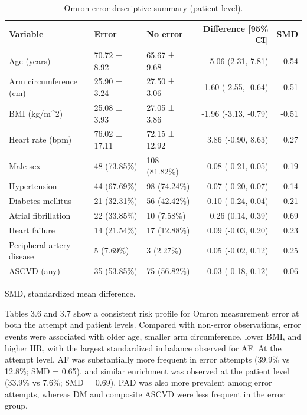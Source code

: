 \documentclass[
  12pt,
  letterpaper,
  openany,
  oneside]{book}
\begin{document}
\begin{table}
\caption{Omron error descriptive summary (patient-level).}\tabularnewline

\fontsize{10.0pt}{13.0pt}\selectfont
\begin{tabular*}{1\linewidth}{@{\extracolsep{\fill}}lllrr}
\toprule
{\bfseries Variable} & {\bfseries Error} & {\bfseries No error} & {\bfseries Difference
[95\% CI]} & {\bfseries SMD} \\ 
\midrule\addlinespace[2.5pt]
Age (years) & 70.72 ± 8.92 & 65.67 ± 9.68 & 5.06 (2.31, 7.81) & 0.54 \\ 
Arm circumference (cm) & 25.90 ± 3.24 & 27.50 ± 3.06 & -1.60 (-2.55, -0.64) & -0.51 \\ 
BMI (kg/m\textasciicircum{}2) & 25.08 ± 3.93 & 27.05 ± 3.86 & -1.96 (-3.13, -0.79) & -0.51 \\ 
Heart rate (bpm) & 76.02 ± 17.11 & 72.15 ± 12.92 & 3.86 (-0.90, 8.63) & 0.27 \\ 
Male sex & 48 (73.85\%) & 108 (81.82\%) & -0.08 (-0.21, 0.05) & -0.19 \\ 
Hypertension & 44 (67.69\%) & 98 (74.24\%) & -0.07 (-0.20, 0.07) & -0.14 \\ 
Diabetes mellitus & 21 (32.31\%) & 56 (42.42\%) & -0.10 (-0.24, 0.04) & -0.21 \\ 
Atrial fibrillation & 22 (33.85\%) & 10 (7.58\%) & 0.26 (0.14, 0.39) & 0.69 \\ 
Heart failure & 14 (21.54\%) & 17 (12.88\%) & 0.09 (-0.03, 0.20) & 0.23 \\ 
Peripheral artery disease & 5 (7.69\%) & 3 (2.27\%) & 0.05 (-0.02, 0.12) & 0.25 \\ 
ASCVD (any) & 35 (53.85\%) & 75 (56.82\%) & -0.03 (-0.18, 0.12) & -0.06 \\ 
\bottomrule
\end{tabular*}
\begin{minipage}{\linewidth}
\vspace{.05em}
SMD, standardized mean difference.\\
\end{minipage}
\end{table}

Tables 3.6 and 3.7 show a consistent risk profile for Omron measurement
error at both the attempt and patient levels. Compared with non-error
observations, error events were associated with older age, smaller arm
circumference, lower BMI, and higher HR, with the largest standardized
imbalance observed for AF. At the attempt level, AF was substantially
more frequent in error attempts (39.9\% vs 12.8\%; SMD = 0.65), and
similar enrichment was observed at the patient level (33.9\% vs 7.6\%;
SMD = 0.69). PAD was also more prevalent among error attempts, whereas
DM and composite ASCVD were less frequent in the error group.
\end{document}
